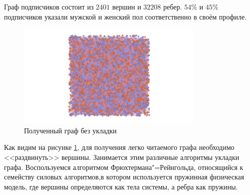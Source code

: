 Граф подписчиков состоит из $2401$ вершин и $32208$ ребер.
$54\%$ и $45\%$ подписчиков указали мужской и женский пол соответственно в своём профиле.

\begin{figure}[H]
    \centering
    \includegraphics[height = 5cm]{pictures/Graph_without_layout.png}
    \caption{Полученный граф без укладки}
    \label{fig:graph_without_layout}
\end{figure}
Как видим на рисунке \ref{fig:graph_without_layout}, для получения легко читаемого графа необходимо <<раздвинуть>> вершины. Занимается этим различные алгоритмы укладки графа. Воспользуемся алгоритмом Фрюхтермана"=Рейнгольда, относящийся к семейству силовых алгоритмов,в котором используется пружинная физическая модель, где вершины определяются как тела системы, а ребра как пружины.
